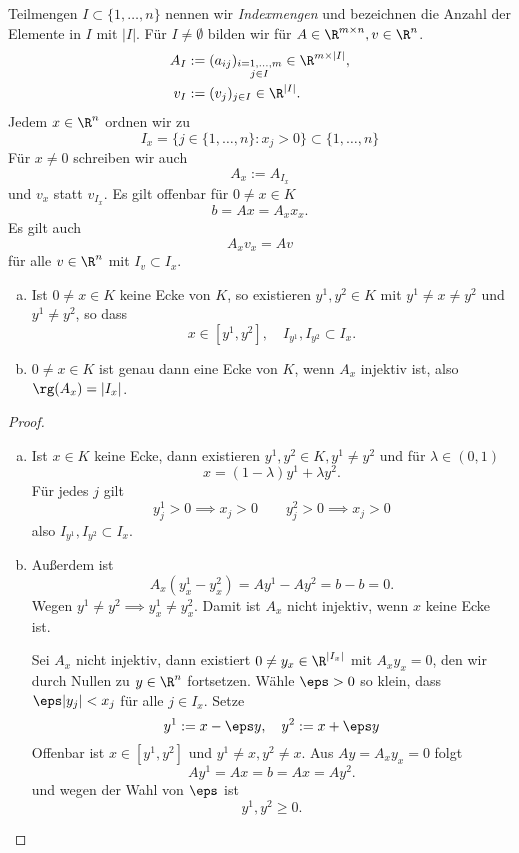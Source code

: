 \begin{df} \label{3.5}
	Teilmengen $I \subset \{1, \dotsc, n\}$ nennen wir \emph{Indexmengen} und bezeichnen die Anzahl der Elemente in $I$ mit $|I|$.
	Für $I \neq \emptyset$ bilden wir für $A \in \R^{m\times n}, v \in \R^n$.
	\begin{align*}
		A_I &:= (a_{ij})_{\substack{i=1,\dotsc,m \\ j \in I}}
			\in \R^{m\times |I|}, \\
		v_I &:= (v_j)_{j\in I}
			\in \R^{|I|}.
	\end{align*}
	Jedem $x \in \R^n$ ordnen wir zu
	\[
		I_x = \Big\{ j \in \{1, \dotsc, n\} : x_j > 0 \Big\}
		\subset \{1, \dotsc, n\}
	\]
	Für $x \neq 0$ schreiben wir auch
	\[
		A_x := A_{I_x}
	\]
	und $v_x$ statt $v_{I_x}$.
	Es gilt offenbar für $0 \neq x \in K$
	\[
		b = Ax = A_x x_x.
	\]
	Es gilt auch
	\[
		A_x v_x = A v
	\]
	für alle $v \in \R^n$ mit $I_v \subset I_x$.
\end{df}

\begin{lem} \label{3.6}
	\begin{enumerate}[(a)]
		\item
			Ist $0 \neq x \in K$ keine Ecke von $K$, so existieren $y^1, y^2 \in K$ mit $y^1 \neq x \neq y^2$ und $y^1 \neq y^2$, so dass
			\[
				x \in [y^1, y^2], \quad I_{y^1}, I_{y^2} \subset I_x.
			\]
		\item
			$0 \neq x \in K$ ist genau dann eine Ecke von $K$, wenn $A_x$ injektiv ist, also $\rg(A_x) = |I_x|$.
	\end{enumerate}
	\begin{proof}
		\begin{enumerate}[(a)]
			\item
				Ist $x \in K$ keine Ecke, dann existieren $y^1, y^2 \in K, y^1 \neq y^2$ und für $\lambda \in (0,1)$
				\[
					x = (1-\lambda) y^1 + \lambda y^2.
				\]
				Für jedes $j$ gilt
				\[
					y_j^1 > 0 \implies x_j > 0 \qquad
					y_j^2 > 0 \implies x_j > 0
				\]
				also $I_{y^1}, I_{y^2} \subset I_x$.
			\item
				Außerdem ist
				\[
					A_x (y_x^1 - y_x^2)
					= Ay^1 - Ay^2
					= b - b = 0.
				\]
				Wegen $y^1 \neq y^2 \implies y_x^1 \neq  y_x^2$.
				Damit ist $A_x$ nicht injektiv, wenn $x$ keine Ecke ist.

				Sei $A_x$ nicht injektiv, dann existiert $0 \neq y_x \in \R^{|I_x|}$ mit $A_x y_x = 0$, den wir durch Nullen zu $y \in \R^n$ fortsetzen.
				Wähle $\eps > 0$ so klein, dass $\eps |y_j| < x_j$ für alle $j \in I_x$.
				Setze
				\[
					y^1 := x - \eps y,
					\quad
					y^2 := x + \eps y
				\]
				Offenbar ist $x \in [y^1, y^2]$ und $y^1 \neq x, y^2 \neq x$.
				Aus $Ay = A_x y_x = 0$ folgt
				\[
					Ay^1 = Ax = b = Ax = Ay^2.
				\]
				und wegen der Wahl von $\eps$ ist
				\[
					y^1, y^2 \ge 0.
				\]
		\end{enumerate}
	\end{proof}
\end{lem}

